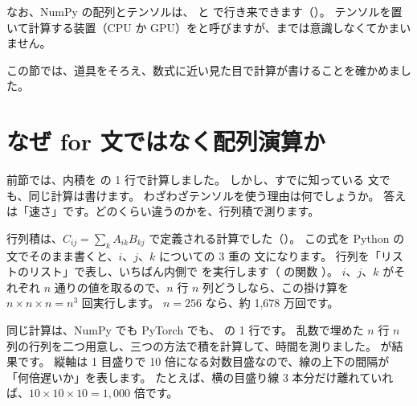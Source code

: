 なお、NumPy の配列とテンソルは、 と  で行き来できます（）。
テンソルを置いて計算する装置（CPU か GPU）をと呼びますが、までは意識しなくてかまいません。

この節では、道具をそろえ、数式に近い見た目で計算が書けることを確かめました。

\section{なぜ for 文ではなく配列演算か}\label{sec:pt-speed}

前節では、内積を  の 1 行で計算しました。
しかし、すでに知っている  文でも、同じ計算は書けます。
わざわざテンソルを使う理由は何でしょうか。
答えは「速さ」です。どのくらい違うのかを、行列積で測ります。

行列積は、$C_{ij}=\sum_{k}A_{ik}B_{kj}$ で定義される計算でした（）。
この式を Python の  文でそのまま書くと、$i$、$j$、$k$ についての 3 重の  文になります。
行列を「リストのリスト」で表し、いちばん内側で  を実行します（ の関数 ）。
$i$、$j$、$k$ がそれぞれ $n$ 通りの値を取るので、$n$ 行 $n$ 列どうしなら、この掛け算を $n\times n\times n=n^{3}$ 回実行します。
$n=256$ なら、約 1,678 万回です。

同じ計算は、NumPy でも PyTorch でも、 の 1 行です。
乱数で埋めた $n$ 行 $n$ 列の行列を二つ用意し、三つの方法で積を計算して、時間を測りました。
が結果です。
縦軸は 1 目盛りで 10 倍になる対数目盛なので、線の上下の間隔が「何倍遅いか」を表します。
たとえば、横の目盛り線 3 本分だけ離れていれば、$10\times 10\times 10=1{,}000$ 倍です。

